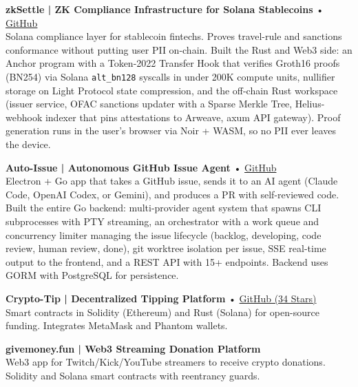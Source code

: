 \documentclass[10pt,a4paper]{article}
\begin{document}
\vspace{2pt}
\noindent\textbf{\footnotesize zkSettle | ZK Compliance Infrastructure for Solana Stablecoins} • {\footnotesize\href{https://github.com/yuribodo/zksettle}{GitHub}}\\
{\footnotesize Solana compliance layer for stablecoin fintechs. Proves travel-rule and sanctions conformance without putting user PII on-chain. Built the Rust and Web3 side: an Anchor program with a Token-2022 Transfer Hook that verifies Groth16 proofs (BN254) via Solana \texttt{alt\_bn128} syscalls in under 200K compute units, nullifier storage on Light Protocol state compression, and the off-chain Rust workspace (issuer service, OFAC sanctions updater with a Sparse Merkle Tree, Helius-webhook indexer that pins attestations to Arweave, axum API gateway). Proof generation runs in the user's browser via Noir + WASM, so no PII ever leaves the device.}

\vspace{2pt}
\noindent\textbf{\footnotesize Auto-Issue | Autonomous GitHub Issue Agent} • {\footnotesize\href{https://github.com/yuribodo/auto-issue}{GitHub}}\\
{\footnotesize Electron + Go app that takes a GitHub issue, sends it to an AI agent (Claude Code, OpenAI Codex, or Gemini), and produces a PR with self-reviewed code. Built the entire Go backend: multi-provider agent system that spawns CLI subprocesses with PTY streaming, an orchestrator with a work queue and concurrency limiter managing the issue lifecycle (backlog, developing, code review, human review, done), git worktree isolation per issue, SSE real-time output to the frontend, and a REST API with 15+ endpoints. Backend uses GORM with PostgreSQL for persistence.}

\vspace{2pt}
\noindent\textbf{\footnotesize Crypto-Tip | Decentralized Tipping Platform} • {\footnotesize\href{https://github.com/Dnreikronos/crypto-tip}{GitHub (34 Stars)}}\\
{\footnotesize Smart contracts in Solidity (Ethereum) and Rust (Solana) for open-source funding. Integrates MetaMask and Phantom wallets.}

\vspace{2pt}
\noindent\textbf{\footnotesize givemoney.fun | Web3 Streaming Donation Platform}\\
{\footnotesize Web3 app for Twitch/Kick/YouTube streamers to receive crypto donations. Solidity and Solana smart contracts with reentrancy guards.}
\end{document}
